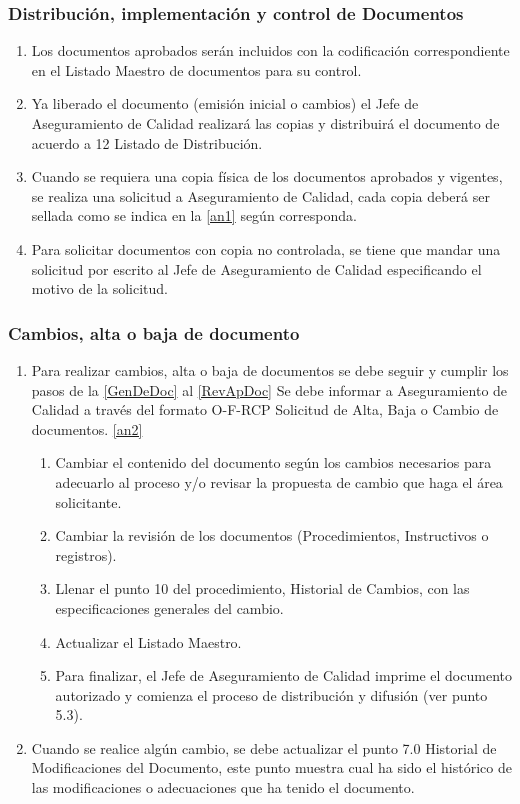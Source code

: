 \subsubsection{Distribución, implementación y control de Documentos}
\begin{enumerate}
    \item Los documentos aprobados serán incluidos con la codificación correspondiente en el Listado Maestro de documentos para su control.
    \item Ya liberado el documento (emisión inicial o cambios) el Jefe de Aseguramiento de Calidad realizará las copias y distribuirá el documento de acuerdo a 12 Listado de Distribución.
    \item Cuando se requiera una copia física de los documentos aprobados y vigentes, se realiza una solicitud a Aseguramiento de Calidad, cada copia deberá ser sellada como se indica en la \cref{an1} según corresponda.
    \item Para solicitar  documentos con copia no controlada, se tiene que mandar una solicitud por escrito al Jefe de Aseguramiento de Calidad especificando el motivo de la solicitud.
\end{enumerate}

\subsubsection{Cambios, alta o baja de documento}
\begin{enumerate}
    \item Para realizar cambios, alta o baja de documentos se debe seguir y cumplir los pasos de la \cref{GenDeDoc} al \cref{RevApDoc} Se debe informar a Aseguramiento de Calidad a través del formato O-F-RCP Solicitud de Alta, Baja o Cambio de documentos. \cref{an2}
    \begin{enumerate}
        \item Cambiar el contenido del documento según los cambios necesarios para adecuarlo al  proceso y/o revisar la propuesta de cambio que haga el área solicitante.
        \item Cambiar la revisión de los documentos (Procedimientos, Instructivos o registros).
        \item Llenar el punto 10 del procedimiento, Historial de Cambios, con las especificaciones generales del cambio.
        \item Actualizar el Listado Maestro.
        \item Para finalizar, el Jefe de Aseguramiento de Calidad imprime el documento autorizado y comienza el proceso de distribución y difusión (ver punto 5.3).
    \end{enumerate}
    \item Cuando se realice algún cambio, se debe actualizar el punto 7.0 Historial de Modificaciones del Documento, este punto muestra cual ha sido el histórico de las modificaciones o adecuaciones que ha tenido el documento.
\end{enumerate}

